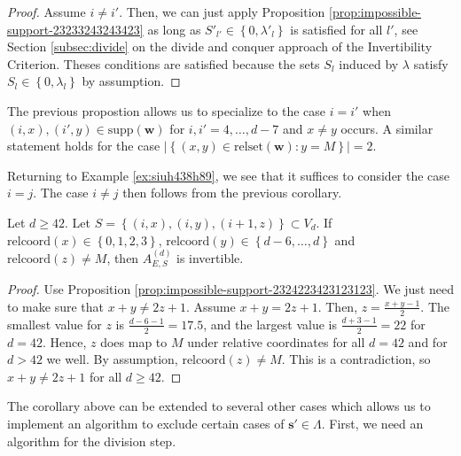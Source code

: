 \begin{proof}
    Assume \( i \neq i' \). Then, we can just apply Proposition \ref{prop:impossible-support-23233243243423} as long as \( S'_{l'} \in \left\{ 0, \lambda'_l \right\} \) is satisfied for all \( l' \), see Section \ref{subsec:divide} on the divide and conquer approach of the Invertibility Criterion. Theses conditions are satisfied because the sets \( S_l \) induced by \( \lambda \) satisfy \( S_{l} \in \left\{ 0, \lambda_l \right\} \) by assumption.
\end{proof}

\begin{corollary}
    The previous propostion allows us to specialize to the case \( i = i' \) when \( (i,x), (i',y) \in \mathrm{supp}(\mathbf{w}) \) for \( i,i' = 4, \dots, d-7 \) and \( x \neq y \) occurs. A similar statement holds for the case \( \lvert \left\{ (x,y) \in \mathrm{relset}(\mathbf{w}) : y = M \right\} \rvert = 2 \).
\end{corollary}

\begin{example}
    Returning to Example \ref{ex:siuh438h89}, we see that it suffices to consider the case \( i = j \). The case \( i \neq j \) then follows from the previous corollary.
\end{example}

\begin{corollary}
    Let \( d \geq 42 \).
    Let \( S = \left\{ (i,x), (i,y), (i+1,z) \right\} \subset V_d \). If \( \mathrm{relcoord}(x) \in \left\{ 0,1,2,3 \right\} \), \( \mathrm{relcoord}(y) \in \left\{ d-6, \dots, d \right\} \) and \( \mathrm{relcoord}(z) \neq M  \), then \( A^{(d)}_{E, S} \) is invertible.
\end{corollary}

\begin{proof}
    Use Proposition \ref{prop:impossible-support-2324223423123123}. We just need to make sure that \( x + y \neq 2z + 1 \). Assume \( x + y = 2z + 1 \). Then, \( z = \frac{x+y -1}{2} \). The smallest value for \( z \) is \( \frac{d-6-1}{2} = 17.5 \), and the largest value is \( \frac{d+3-1}{2} = 22 \) for \( d = 42 \). Hence, \( z \) does map to \( M \) under relative coordinates for all \( d = 42 \) and for \( d > 42 \) we well. By assumption,  \( \mathrm{relcoord}(z) \neq M  \). This is a contradiction, so \( x + y \neq 2z + 1 \) for all \( d \geq 42 \).
\end{proof}

The corollary above can be extended to several other cases which allows us to implement an algorithm to exclude certain cases of \( \mathbf{s}' \in \Lambda \). First, we need an algorithm for the division step.

